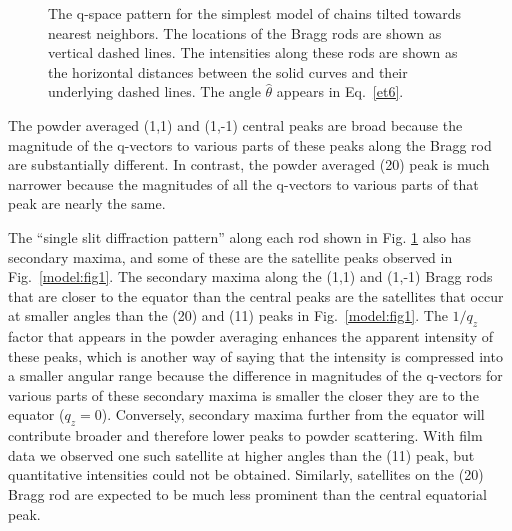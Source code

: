 \begin{figure}[ht]
\centerline {}
\caption{The q-space pattern for the simplest model of chains tilted towards
nearest neighbors.  The locations of the Bragg rods are shown as vertical
dashed lines.  The intensities along these rods are shown as the
horizontal distances between the solid curves and their underlying dashed
lines.  The angle $\hat{\theta}$ appears in Eq.\ \protect\ref{et6}.
\label{model:fig3}}
\end{figure}

The powder averaged (1,1) and (1,-1) central peaks are broad because
the magnitude of the q-vectors to various parts of these peaks
along the Bragg rod are substantially different.
In contrast, the powder averaged (20) peak is much narrower
because the magnitudes of all the q-vectors to various parts of that
peak are nearly the same.  

The ``single slit diffraction pattern'' along each rod shown in 
Fig. \ref{model:fig3}
also has secondary maxima, and some of these are the satellite peaks observed
in Fig.\ \ref{model:fig1}.  The secondary maxima along the (1,1) and (1,-1) Bragg rods
that are closer to the equator than the central peaks are the satellites
that occur at smaller angles than the (20) and (11) peaks in Fig.\ \ref{model:fig1}.
The \(1 / q_{z}\) factor that appears in the powder averaging enhances the
apparent intensity of these peaks, which is another way of saying that
the intensity is compressed into a smaller angular range because the
difference in magnitudes of the q-vectors for various parts of these
secondary maxima is smaller the closer they are to the equator (\(q_{z} = 0\)).
Conversely, secondary maxima further from the equator will contribute
broader and therefore lower peaks to powder scattering.  With film data we 
observed one such satellite at higher angles than the (11) peak,
but quantitative intensities could not be 
obtained.  Similarly, satellites on the (20) Bragg rod are expected to be
much less prominent than the central equatorial peak.
